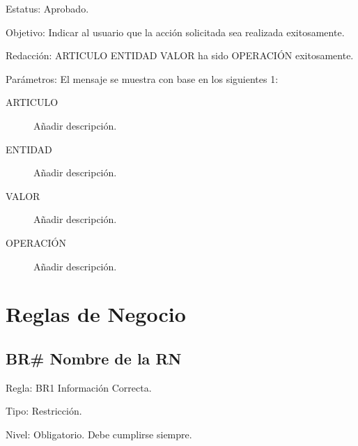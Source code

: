 \documentclass[10pt,spanish]{article}
\begin{document}
	\begin{flushleft}
	Estatus: Aprobado.
	\par\end{flushleft}

	\begin{flushleft}
	Objetivo: Indicar al usuario que la acción solicitada sea realizada
	exitosamente.
	\par\end{flushleft}

	\begin{flushleft}
	Redacción: ARTICULO ENTIDAD VALOR ha sido OPERACIÓN exitosamente.
	\par\end{flushleft}

	\begin{flushleft}
	Parámetros: El mensaje se muestra con base en los siguientes 1:
	\par\end{flushleft}
	\begin{description}
	\item [{ARTICULO}] Añadir descripción. 
	\item [{ENTIDAD}] Añadir descripción. 
	\item [{VALOR}] Añadir descripción. 
	\item [{OPERACIÓN}] Añadir descripción. 
	\end{description}

	\section{Reglas de Negocio}


	\subsection{BR\# Nombre de la RN}

	\begin{flushleft}
	Regla: BR1 Información Correcta.
	\par\end{flushleft}

	\begin{flushleft}
	Tipo: Restricción.
	\par\end{flushleft}

	\begin{flushleft}
	Nivel: Obligatorio. Debe cumplirse siempre.
	\par\end{flushleft}
\end{document}
